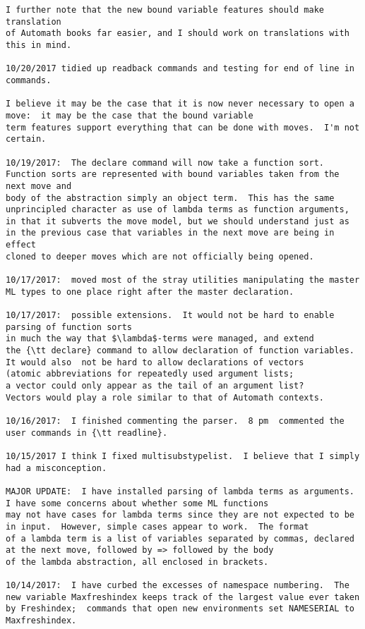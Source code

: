 \documentclass{article}
\begin{document}
{\begin{verbatim}
I further note that the new bound variable features should make translation
of Automath books far easier, and I should work on translations with this in mind.

10/20/2017 tidied up readback commands and testing for end of line in commands.

I believe it may be the case that it is now never necessary to open a move:  it may be the case that the bound variable
term features support everything that can be done with moves.  I'm not certain.

10/19/2017:  The declare command will now take a function sort.  Function sorts are represented with bound variables taken from the next move and
body of the abstraction simply an object term.  This has the same unprincipled character as use of lambda terms as function arguments, 
in that it subverts the move model, but we should understand just as in the previous case that variables in the next move are being in effect
cloned to deeper moves which are not officially being opened.

10/17/2017:  moved most of the stray utilities manipulating the master ML types to one place right after the master declaration.

10/17/2017:  possible extensions.  It would not be hard to enable parsing of function sorts 
in much the way that $\lambda$-terms were managed, and extend
the {\tt declare} command to allow declaration of function variables.  
It would also  not be hard to allow declarations of vectors 
(atomic abbreviations for repeatedly used argument lists;  
a vector could only appear as the tail of an argument list?
Vectors would play a role similar to that of Automath contexts.

10/16/2017:  I finished commenting the parser.  8 pm  commented the user commands in {\tt readline}.

10/15/2017 I think I fixed multisubstypelist.  I believe that I simply had a misconception.

MAJOR UPDATE:  I have installed parsing of lambda terms as arguments.  I have some concerns about whether some ML functions
may not have cases for lambda terms since they are not expected to be in input.  However, simple cases appear to work.  The format
of a lambda term is a list of variables separated by commas, declared at the next move, followed by => followed by the body
of the lambda abstraction, all enclosed in brackets.

10/14/2017:  I have curbed the excesses of namespace numbering.  The new variable Maxfreshindex keeps track of the largest value ever taken by Freshindex;  commands that open new environments set NAMESERIAL to Maxfreshindex.


\end{verbatim}}
\end{document}

